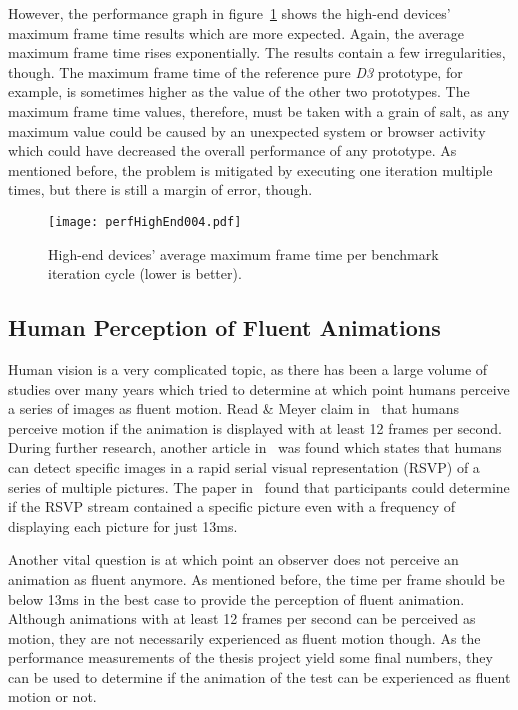 However, the performance graph in figure~\ref{fig:perfHighEnd004} shows the high-end devices' maximum frame time results which are more expected. Again, the average maximum frame time rises exponentially. The results contain a few irregularities, though. The maximum frame time of the reference pure \emph{D3} prototype, for example, is sometimes higher as the value of the other two prototypes. The maximum frame time values, therefore, must be taken with a grain of salt, as any maximum value could be caused by an unexpected system or browser activity which could have decreased the overall performance of any prototype. As mentioned before, the problem is mitigated by executing one iteration multiple times, but there is still a margin of error, though.

\begin{figure}
\centering
\texttt{[image: perfHighEnd004.pdf]}
\caption{High-end devices' average maximum frame time per benchmark iteration cycle (lower is better).}
\label{fig:perfHighEnd004}
\end{figure}

\subsection{Human Perception of Fluent Animations}
\label{sub:humanPerception}


Human vision is a very complicated topic, as there has been a large volume of studies over many years which tried to determine at which point humans perceive a series of images as fluent motion. Read \& Meyer claim in~\cite{RestorationOfMotionPictureFilm} that humans perceive motion if the animation is displayed with at least 12 frames per second. During further research, another article in~\cite{Potter2014} was found which states that humans can detect specific images in a rapid serial visual representation (RSVP) of a series of multiple pictures. The paper in~\cite{Potter2014} found that participants could determine if the RSVP stream contained a specific picture even with a frequency of displaying each picture for just 13ms. 

Another vital question is at which point an observer does not perceive an animation as fluent anymore. As mentioned before, the time per frame should be below 13ms in the best case to provide the perception of fluent animation. Although animations with at least 12 frames per second can be perceived as motion, they are not necessarily experienced as fluent motion though. As the performance measurements of the thesis project yield some final numbers, they can be used to determine if the animation of the test can be experienced as fluent motion or not.


